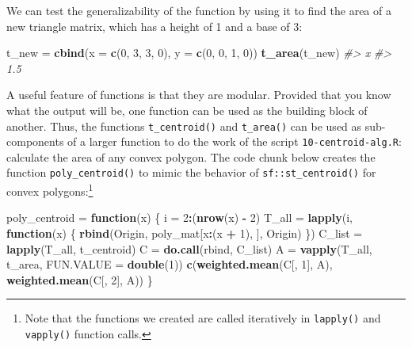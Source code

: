\documentclass[]{krantz}
\newenvironment{Shaded}{\begin{snugshade}}{\end{snugshade}}
\newcommand{\CommentTok}[1]{\textcolor[rgb]{0.37,0.37,0.37}{\textit{#1}}}
\newcommand{\ControlFlowTok}[1]{\textcolor[rgb]{0.27,0.27,0.27}{\textbf{#1}}}
\newcommand{\DataTypeTok}[1]{\textcolor[rgb]{0.27,0.27,0.27}{#1}}
\newcommand{\DecValTok}[1]{\textcolor[rgb]{0.06,0.06,0.06}{#1}}
\newcommand{\KeywordTok}[1]{\textcolor[rgb]{0.27,0.27,0.27}{\textbf{#1}}}
\newcommand{\NormalTok}[1]{#1}
\newcommand{\OperatorTok}[1]{\textcolor[rgb]{0.43,0.43,0.43}{\textbf{#1}}}
\newcommand{\StringTok}[1]{\textcolor[rgb]{0.5,0.5,0.5}{#1}}
\let\rmarkdownfootnote\footnote%
\def\footnote{\protect\rmarkdownfootnote}
\begin{document}
We can test the generalizability of the function by using it to find the area of a new triangle matrix, which has a height of 1 and a base of 3:

\begin{Shaded}
\begin{Highlighting}[]
\NormalTok{t_new =}\StringTok{ }\KeywordTok{cbind}\NormalTok{(}\DataTypeTok{x =} \KeywordTok{c}\NormalTok{(}\DecValTok{0}\NormalTok{, }\DecValTok{3}\NormalTok{, }\DecValTok{3}\NormalTok{, }\DecValTok{0}\NormalTok{),}
              \DataTypeTok{y =} \KeywordTok{c}\NormalTok{(}\DecValTok{0}\NormalTok{, }\DecValTok{0}\NormalTok{, }\DecValTok{1}\NormalTok{, }\DecValTok{0}\NormalTok{))}
\KeywordTok{t_area}\NormalTok{(t_new)}
\CommentTok{#>   x }
\CommentTok{#> 1.5}
\end{Highlighting}
\end{Shaded}

A useful feature of functions is that they are modular.
Provided that you know what the output will be, one function can be used as the building block of another.
Thus, the functions \texttt{t\_centroid()} and \texttt{t\_area()} can be used as sub-components of a larger function to do the work of the script \texttt{10-centroid-alg.R}: calculate the area of any convex polygon.
The code chunk below creates the function \texttt{poly\_centroid()} to mimic the behavior of \texttt{sf::st\_centroid()} for convex polygons:\footnote{Note that the functions we created are called iteratively in \texttt{lapply()} and \texttt{vapply()} function calls.}

\begin{Shaded}
\begin{Highlighting}[]
\NormalTok{poly_centroid =}\StringTok{ }\ControlFlowTok{function}\NormalTok{(x) \{}
\NormalTok{  i =}\StringTok{ }\DecValTok{2}\OperatorTok{:}\NormalTok{(}\KeywordTok{nrow}\NormalTok{(x) }\OperatorTok{-}\StringTok{ }\DecValTok{2}\NormalTok{)}
\NormalTok{  T_all =}\StringTok{ }\KeywordTok{lapply}\NormalTok{(i, }\ControlFlowTok{function}\NormalTok{(x) \{}
    \KeywordTok{rbind}\NormalTok{(Origin, poly_mat[x}\OperatorTok{:}\NormalTok{(x }\OperatorTok{+}\StringTok{ }\DecValTok{1}\NormalTok{), ], Origin)}
\NormalTok{  \})}
\NormalTok{  C_list =}\StringTok{ }\KeywordTok{lapply}\NormalTok{(T_all, t_centroid)}
\NormalTok{  C =}\StringTok{ }\KeywordTok{do.call}\NormalTok{(rbind, C_list)}
\NormalTok{  A =}\StringTok{ }\KeywordTok{vapply}\NormalTok{(T_all, t_area, }\DataTypeTok{FUN.VALUE =} \KeywordTok{double}\NormalTok{(}\DecValTok{1}\NormalTok{))}
  \KeywordTok{c}\NormalTok{(}\KeywordTok{weighted.mean}\NormalTok{(C[, }\DecValTok{1}\NormalTok{], A), }\KeywordTok{weighted.mean}\NormalTok{(C[, }\DecValTok{2}\NormalTok{], A))}
\NormalTok{\}}
\end{Highlighting}
\end{Shaded}
\end{document}
